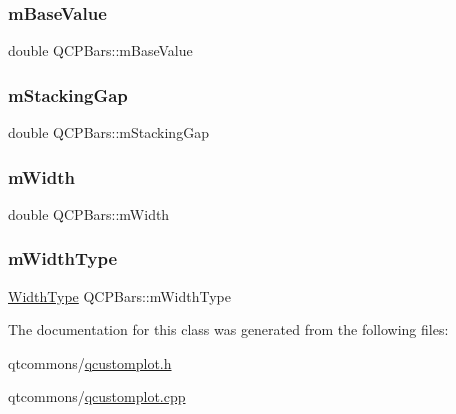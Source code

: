 \mbox{\label{class_q_c_p_bars_aa0515cf47fa6044cc28e59b1ae5ec759}} 
\subsubsection{\texorpdfstring{mBaseValue}{mBaseValue}}
{\footnotesize\ttfamily double Q\+C\+P\+Bars\+::m\+Base\+Value\hspace{0.3cm}{\ttfamily [protected]}}

\mbox{\label{class_q_c_p_bars_a2022ddbcf8b464a05d434700a666da18}} 
\subsubsection{\texorpdfstring{mStackingGap}{mStackingGap}}
{\footnotesize\ttfamily double Q\+C\+P\+Bars\+::m\+Stacking\+Gap\hspace{0.3cm}{\ttfamily [protected]}}

\mbox{\label{class_q_c_p_bars_a7c4e0f2246f8133f48a9c3f24cf5b920}} 
\subsubsection{\texorpdfstring{mWidth}{mWidth}}
{\footnotesize\ttfamily double Q\+C\+P\+Bars\+::m\+Width\hspace{0.3cm}{\ttfamily [protected]}}

\mbox{\label{class_q_c_p_bars_a94dba1309496c7601d01e2c59715cbb3}} 
\subsubsection{\texorpdfstring{mWidthType}{mWidthType}}
{\footnotesize\ttfamily \mbox{\hyperlink{class_q_c_p_bars_a65dbbf1ab41cbe993d71521096ed4649}{Width\+Type}} Q\+C\+P\+Bars\+::m\+Width\+Type\hspace{0.3cm}{\ttfamily [protected]}}



The documentation for this class was generated from the following files\+:\begin{DoxyCompactItemize}
\item 
qtcommons/\mbox{\hyperlink{qcustomplot_8h}{qcustomplot.\+h}}\item 
qtcommons/\mbox{\hyperlink{qcustomplot_8cpp}{qcustomplot.\+cpp}}\end{DoxyCompactItemize}
